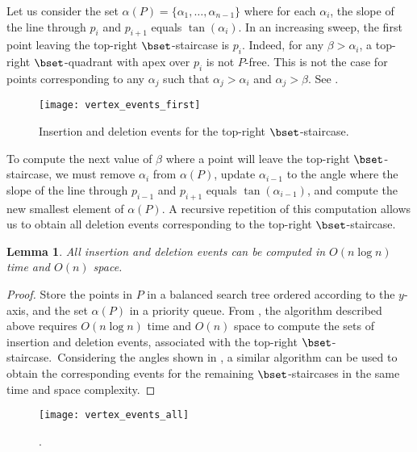 \documentclass[11pt,letterpaper,english]{article}
\newtheorem{lemma}{Lemma}
\theoremstyle{definition}
\begin{document}
Let us consider the set
$\alpha(P) = \{ \alpha_1, \ldots, \alpha_{n-1} \}$ where for each
$\alpha_i$, the slope of the line through $p_i$ and $p_{i+1}$ equals
$\tan(\alpha_i)$. In an increasing sweep, the first point leaving
the top-right $\bset$-staircase is $p_i$.
Indeed, for any $\beta > \alpha_i$, a
top-right $\bset$-quadrant with apex over $p_i$ is not $P$-free. This
is not the case for points corresponding to any $\alpha_j$ such that
$\alpha_j > \alpha_i$ and $\alpha_j > \beta$. See .

\begin{figure}[ht]
  \centering
  \begin{minipage}{0.9\textwidth}
    \centering
    \texttt{[image: vertex\_events\_first]}
\caption{Insertion and deletion events for the top-right
      $\bset$-staircase.}
    \label{bhull:fig:events}
  \end{minipage}
\end{figure}

To compute the next value of $\beta$ where a point will leave the
top-right $\bset$-staircase, we must remove $\alpha_i$ from
$\alpha(P)$, update $\alpha_{i-1}$ to the angle where the slope of the
line through $p_{i-1}$ and $p_{i+1}$ equals $\tan(\alpha_{i-1})$,
and compute the new smallest element of $\alpha(P)$. A recursive
repetition of this computation allows us to obtain all deletion events
corresponding to the top-right $\bset$-staircase.

\begin{lemma}\label{bhull:lemma:point_events}
  All insertion and deletion events can be computed in $O(n\log n)$
  time and $O(n)$ space.
\end{lemma}
\begin{proof}
  Store the points in $P$ in a balanced search tree ordered according
  to the $y$-axis, and the set $\alpha(P)$ in a priority queue. From
  , the algorithm described above
  requires $O(n \log n)$ time and $O(n)$ space to compute the sets of
  insertion and deletion events, associated with the top-right
  $\bset$-staircase.~Considering the angles shown in
  , a similar algorithm can be used to
  obtain the corresponding events for the remaining $\bset$-staircases
  in the same time and space complexity.
\end{proof}

\begin{figure}[ht]
  \centering
  \begin{minipage}{0.9\textwidth}
    \centering
    \texttt{[image: vertex\_events\_all]}
\caption{.}
    \label{bhull:fig:point_events}
  \end{minipage}
\end{figure}
\end{document}
